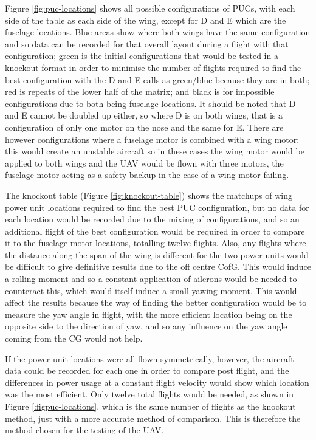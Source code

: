 \documentclass[../../main.tex]{subfiles}
\begin{document}
Figure \ref{fig:puc-locations} shows all possible configurations of PUCs, with each side of the table as each side of the wing, except for D and E which are the fuselage locations.
Blue areas show where both wings have the same configuration and so data can be recorded for that overall layout during a flight with that configuration; green is the initial configurations that would be tested in a knockout format in order to minimise the number of flights required to find the best configuration with the D and E calls as green/blue because they are in both; red is repeats of the lower half of the matrix; and black is for impossible configurations due to both being fuselage locations.
It should be noted that D and E cannot be doubled up either, so where D is on both wings, that is a configuration of only one motor on the nose and the same for E.
There are however configurations where a fuselage motor is combined with a wing motor: this would create an unstable aircraft so in these cases the wing motor would be applied to both wings and the UAV would be flown with three motors, the fuselage motor acting as a safety backup in the case of a wing motor failing.


The knockout table (Figure \ref{fig:knockout-table}) shows the matchups of wing power unit locations required to find the best PUC configuration, but no data for each location would be recorded due to the mixing of configurations, and so an additional flight of the best configuration would be required in order to compare it to the fuselage motor locations, totalling twelve flights.
Also, any flights where the distance along the span of the wing is different for the two power units would be difficult to give definitive results due to the off centre CofG.
This would induce a rolling moment and so a constant application of ailerons would be needed to counteract this, which would itself induce a small yawing moment.
This would affect the results because the way of finding the better configuration would be to measure the yaw angle in flight, with the more efficient location being on the opposite side to the direction of yaw, and so any influence on the yaw angle coming from the CG would not help. 

If the power unit locations were all flown symmetrically, however, the aircraft data could be recorded for each one in order to compare post flight, and the differences in power usage at a constant flight velocity would show which location was the most efficient.
Only twelve total flights would be needed, as shown in Figure \ref{:figpuc-locations}, which is the same number of flights as the knockout method, just with a more accurate method of comparison.
This is therefore the method chosen for the testing of the UAV.
\end{document}
